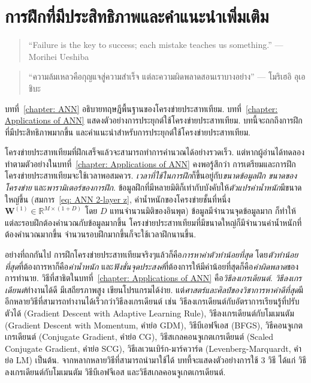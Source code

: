 \chapter{การฝึกที่มีประสิทธิภาพและคำแนะนำเพิ่มเติม}
\label{chapter: Suggestions for ANN}

\begin{verse}
``Failure is the key to success;
each mistake teaches us something.''
--- Morihei Ueshiba
\end{verse}

\begin{verse}
``ความล้มเหลวคือกุญแจสู่ความสำเร็จ
แต่ละความผิดพลาดสอนเราบางอย่าง''
--- โมริเฮอิ อุเอชิบะ
\end{verse}

บทที่~\ref{chapter: ANN} อธิบายทฤษฎีพื้นฐานของโครงข่ายประสาทเทียม.
บทที่~\ref{chapter: Applications of ANN} แสดงตัวอย่างการประยุกต์ใช้โครงข่ายประสาทเทียม.
บทนี้จะถกถึงการฝึกที่มีประสิทธิภาพมากขึ้น และคำแนะนำสำหรับการประยุกต์ใช้โครงข่ายประสาทเทียม.

โครงข่ายประสาทเทียมที่ฝึกเสร็จแล้วจะสามารถทำการคำนวณได้อย่างรวดเร็ว.
แต่หากผู้อ่านได้ทดลองทำตามตัวอย่างในบทที่~\ref{chapter: Applications of ANN} คงพอรู้สึกว่า การเตรียมและการฝึกโครงข่ายประสาทเทียมจะใช้เวลาพอสมควร.
\textit{เวลาที่ใช้ในการฝึก}ก็ขึ้นอยู่กับ\textit{ขนาดข้อมูลฝึก} \textit{ขนาดของโครงข่าย} 
และ\textit{พารามิเตอร์ของการฝึก}.
ข้อมูลฝึกที่มีหลายมิติก็เท่ากับบังคับให้\textit{ตัวแปรค่าน้ำหนัก}มีขนาดใหญ่ขึ้น (สมการ~\ref{eq: ANN 2-layer z}, ค่าน้ำหนักของโครงข่ายชั้นที่หนึ่ง $\mathbf{W}^{(1)} \in \mathbb{R}^{M \times (1+D)}$ 
โดย $D$ แทนจำนวนมิติของอินพุต)
ข้อมูลมีจำนวนจุดข้อมูลมาก ก็ทำให้แต่ละรอบฝึกต้องคำนวณกับข้อมูลมากขึ้น
โครงข่ายประสาทเทียมที่มีขนาดใหญ่ก็มีจำนวนค่าน้ำหนักที่ต้องคำนวณมากขึ้น
จำนวนรอบฝึกมากขึ้นก็จะใช้เวลาฝึกนานขึ้น.

อย่างที่ถกกันไป การฝึกโครงข่ายประสาทเทียมจริงๆแล้วก็คือ\textit{การหาค่าตัวทำน้อยที่สุด} โดย\textit{ตัวทำน้อยที่สุด}ที่ต้องการหาก็คือ\textit{ค่าน้ำหนัก} 
และ\textit{ฟังชั่นจุดประสงค์}ที่ต้องการให้มีค่าน้อยที่สุดก็คือ\textit{ค่าผิดพลาด}ของการทำนาย.
วิธีที่สาธิตในบทที่~\ref{chapter: Applications of ANN} คือ\textit{วิธีลงเกรเดียนต์}.
\textit{วิธีลงเกรเดียนต์}ทำงานได้ดี มีเสถียรภาพสูง เขียนโปรแกรมได้ง่าย.
แต่\textit{ศาสตร์และศิลป์ของวิชาการหาค่าดีที่สุด}มีอีกหลายวิธีที่สามารถทำงานได้เร็วกว่าวิธีลงเกรเดียนต์ เช่น วิธีลงเกรเดียนต์กับอัตราการเรียนรู้ที่ปรับตัวได้ (Gradient Descent with Adaptive Learning Rule),
วิธีลงเกรเดียนต์กับโมเมนตัม (Gradient Descent with Momentum, คำย่อ GDM), 
วิธีบีเอฟจีเอส (BFGS), 
วิธีคอนจูเกตเกรเดียนต์ (Conjugate Gradient, คำย่อ CG), 
วิธีสเกลคอนจูเกตเกรเดียนต์ (Scaled Conjugate Gradient, คำย่อ SCG), 
วิธีเลเวนเบิร์ก-มาร์ควาร์ด (Levenberg-Marquardt, คำย่อ LM) เป็นต้น.
จากหลากหลายวิธีที่สามารถนำมาใช้ได้ บทที้จะแสดงตัวอย่างการใช้ $3$ วิธี ได้แก่
วิธีลงเกรเดียนต์กับโมเมนตัม
วิธีบีเอฟจีเอส
และวิธีสเกลคอนจูเกตเกรเดียนต์.

